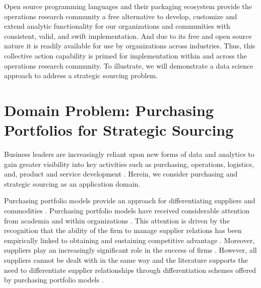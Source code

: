 \documentclass[twocolumn]{svjour3}       %
\begin{document}
Open source programming languages and their packaging ecosystem provide the operations research community a free alternative to develop, customize and extend analytic functionality for our organizations and communities with consistent, valid, and swift implementation. And due to its free and open source nature it is readily available for use by organizations across industries. Thus, this collective action capability is primed for implementation within and across the operations research community.  To illustrate, we will demonstrate a data science approach to address a strategic sourcing problem.


\section{Domain Problem: Purchasing Portfolios for Strategic Sourcing}
\label{sec:3}

Business leaders are increasingly reliant upon new forms of data and analytics to gain greater visibility into key activities such as purchasing, operations, logistics, and, product and service development \citep{cps15,hbej14}. Herein, we consider purchasing and strategic sourcing as an application domain. 

Purchasing portfolio models provide an approach for differentiating suppliers \citep{pwa12,md05,br01} and commodities \citep{oe97,ns00}.  Purchasing portfolio models have received considerable attention from academia and within organizations \citep{gv03}.  This attention is driven by the recognition that the ability of the firm to manage supplier relations has been empirically linked to obtaining and sustaining competitive advantage \citep{cpl04,dcc98}. Moreover, suppliers play an increasingly significant role in the success of firms \citep{wj04}. However, all suppliers cannot be dealt with in the same way and the literature supports the need to differentiate supplier relationships through differentiation schemes offered by purchasing portfolio models \citep{gm08,ly01}.  
\end{document}
